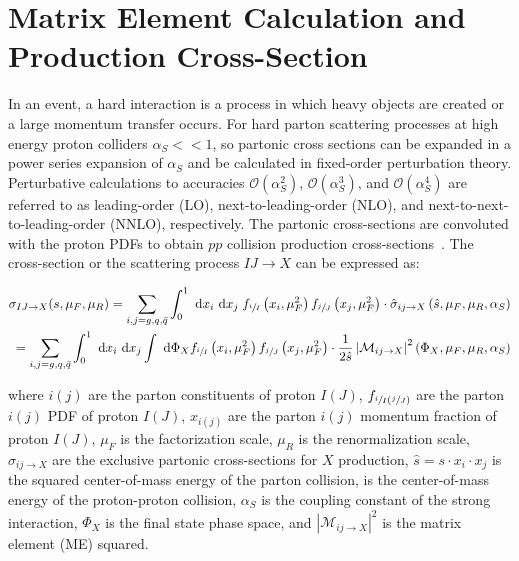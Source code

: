 \section{Matrix Element Calculation and Production Cross-Section}
\label{sec:Matrix_Element_Calculation_and_Production_Cross-section}
In an event, a hard interaction is a process in which heavy objects are created or a large momentum transfer occurs.
For hard parton scattering processes at high energy proton colliders $\alpha_S << 1$, so partonic cross sections can be expanded in a power series expansion of $\alpha_S$ and be calculated in fixed-order perturbation theory. 
Perturbative calculations to accuracies $\mathcal{O}(\alpha^2_S)$, $\mathcal{O}(\alpha^3_S)$, and $\mathcal{O}(\alpha^4_S)$ are referred to as leading-order (LO), next-to-leading-order (NLO), and next-to-next-to-leading-order (NNLO), respectively.
The partonic cross-sections are convoluted with the proton PDFs to obtain $pp$ collision production cross-sections~\cite{BUCKLEY2011145}.
The cross-section or the scattering process $IJ \rightarrow X$ can be expressed as:
\begin{linenomath*}
\begin{align}
\sigma_{IJ \rightarrow X}(s, \mu_F, \mu_R) = \sum_{i, j = g, q, \bar{q}}^{} \int_{0}^{1} \mathrm{~d} x_i \mathrm{~d} x_j \; f_{\sfrac{i}{I}}\left(x_i, \mu_F^2\right) f_{\sfrac{j}{J}}\left(x_j, \mu_F^2\right) \cdot \hat{\sigma}_{i j \rightarrow X}\left(\hat{s}, \mu_F, \mu_R, \alpha_S\right) \\
=\sum_{i, j=g, q, \bar{q}} \int_{0}^{1} \mathrm{~d} x_i \mathrm{~d} x_j \int \mathrm{~d} \Phi_X f_{\sfrac{i}{I}}\left(x_i, \mu_F^2\right) f_{\sfrac{j}{J}}\left(x_j, \mu_F^2\right) \cdot \frac{1}{2 \hat{s}}\left\vert \mathcal{M}_{i j \rightarrow X}\right\vert^2\left(\Phi_X, \mu_F, \mu_R, \alpha_S\right)
\label{ttbar_crosssection}
\end{align}
\end{linenomath*}
where $i(j)$ are the parton constituents of proton $I(J)$, $f_{{\sfrac{i}{I}}({\sfrac{j}{J}})}$ are the parton $i(j)$ PDF of proton $I(J)$, $x_{i(j)}$ are the parton $i(j)$ momentum fraction of proton $I(J)$, $\mu_F$ is the factorization scale, $\mu_R$ is the renormalization scale, $\sigma_{i j \rightarrow X}$ are the exclusive partonic cross-sections for $X$ production, $\hat{s} = s \cdot x_i \cdot x_j$ is the squared center-of-mass energy of the parton collision, \beamenergy is the center-of-mass energy of the proton-proton collision, $\alpha_S$ is the coupling constant of the strong interaction, $\Phi_X$ is the final state phase space, and $\left\vert \mathcal{M}_{i j \rightarrow X}\right\vert^2$ is the matrix element (ME) squared.
